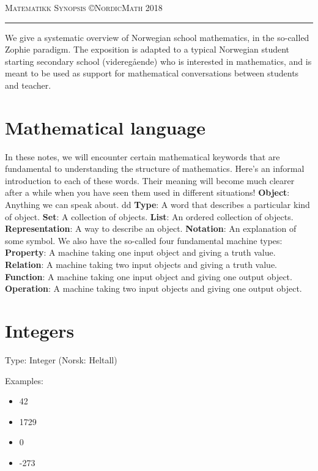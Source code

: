 \documentclass[12pt]{amsart}
\begin{document}
\thispagestyle{empty}

{\scshape Matematikk} \hfill {\scshape \large Synopsis} \hfill {\scshape \copyright NordicMath 2018}

\smallskip

\hrule

\vskip5pt

We give a systematic overview of Norwegian school mathematics, in the so-called Zophie paradigm.
\vskip10pt
The exposition is adapted to a typical Norwegian student starting secondary school (videreg{\aa}ende) who is interested in mathematics, and is meant to be used as support for mathematical conversations between students and teacher.

\section{Mathematical language}

In these notes, we will encounter certain mathematical keywords that are fundamental to understanding the structure of mathematics.
\vskip10pt
Here's an informal introduction to each of these words. Their meaning will become much clearer after a while when you have seen them used in different situations!
\vskip10pt
{\bf Object}: Anything we can speak about. dd
\vskip10pt
{\bf Type}: A word that describes a particular kind of object.
\vskip10pt
{\bf Set}: A collection of objects.
\vskip10pt
{\bf List}: An ordered collection of objects.
\vskip10pt
{\bf Representation}: A way to describe an object.
\vskip10pt
{\bf Notation}: An explanation of some symbol.
\vskip15pt
We also have the so-called four fundamental machine types:
\vskip5pt
{\bf Property}: A machine taking one input object and giving a truth value.
\vskip10pt
{\bf Relation}: A machine taking two input objects and giving a truth value.
\vskip10pt
{\bf Function}: A machine taking one input object and giving one output object.
\vskip10pt
{\bf Operation}: A machine taking two input objects and giving one output object.
\vskip20pt




\newpage
\section{Integers}

Type: Integer (Norsk: Heltall)

\bigskip
Examples:
\smallskip
\begin{itemize}
  \item 42
  \item 1729
  \item 0
  \item -273
\end{itemize}
\bigskip
\end{document}
